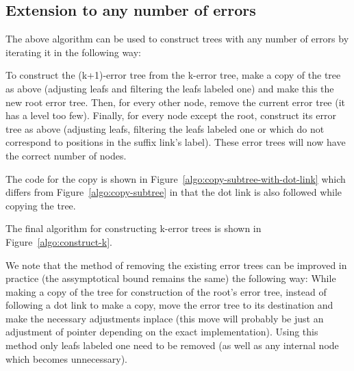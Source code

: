 \subsection{Extension to any number of errors}

The above algorithm can be used to construct trees with any number of errors by iterating it in the following way:

To construct the (k+1)-error tree from the k-error tree, make a copy of the tree as above (adjusting leafs and filtering the leafs labeled one) and make this the new root error tree. Then, for every other node, remove the current error tree (it has a level too few). Finally, for every node except the root, construct its error tree as above (adjusting leafs, filtering the leafs labeled one or which do not correspond to positions in the suffix link's label). These error trees will now have the correct number of nodes.



The code for the copy is shown in Figure~\ref{algo:copy-subtree-with-dot-link} which differs from Figure~\ref{algo:copy-subtree} in that the dot link is also followed while copying the tree.



The final algorithm for constructing k-error trees is shown in Figure~\ref{algo:construct-k}.

We note that the method of removing the existing error trees can be improved in practice (the assymptotical bound remains the same) the following way: While making a copy of the tree for construction of the root's error tree, instead of following a dot link to make a copy, move the error tree to its destination and make the necessary adjustments inplace (this move will probably be just an adjustment of pointer depending on the exact implementation). Using this method only leafs labeled one need to be removed (as well as any internal node which becomes unnecessary).

